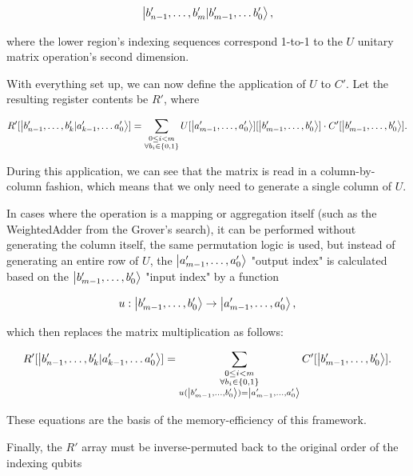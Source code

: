 \begin{align*}
\ket{b'_{n-1},\dots{},b'_{m}|b'_{m-1},\dots{}b'_0},
\end{align*}

where the lower region's indexing sequences correspond 1-to-1 to the $U$ unitary matrix operation's second dimension.

With everything set up, we can now define the application of $U$ to $C'$. Let the resulting register contents be $R'$, where

\begin{align}
\label{RowGenEq}
R'[\ket{b'_{n-1},\dots{},b'_{k}|a'_{k-1},\dots{}a'_0}] = \sum\limits_{\substack{0\leq{}i<m \\ \forall{}b_i\in{}\{0,1\}}}U[\ket{a'_{m-1},\dots{},a'_0}][\ket{b'_{m-1},\dots{},b'_0}] \cdot{} C'[\ket{b'_{m-1},\dots{},b'_0}].
\end{align}

During this application, we can see that the matrix is read in a column-by-column fashion, which means that we only need to generate a single column of $U$.

In cases where the operation is a mapping or aggregation itself (such as the WeightedAdder from the Grover's search), it can be performed without generating the column itself, the same permutation logic is used, but instead of generating an entire row of $U$, the $\ket{a'_{m-1},\dots{},a'_0}$ "output index" is calculated based on the $\ket{b'_{m-1},\dots{},b'_0}$ "input index" by a function

\begin{align*}
    u: \ket{b'_{m-1},\dots{},b'_0} \rightarrow \ket{a'_{m-1},\dots{},a'_0},
\end{align*}

which then replaces the matrix multiplication as follows:

\begin{align}
\label{NoGenEq}
R'[\ket{b'_{n-1},\dots{},b'_{k}|a'_{k-1},\dots{}a'_0}] =
\sum\limits_{\substack{0\leq{}i<m \\ \forall{}b_i\in{}\{0,1\}\\ u(\ket{b'_{m-1},\dots{},b'_0}) =
\ket{a'_{m-1},\dots{},a'_0}}}C'[\ket{b'_{m-1},\dots{},b'_0}].
\end{align}

These equations are the basis of the memory-efficiency of this framework.

Finally, the $R'$ array must be inverse-permuted back to the original order of the indexing qubits

